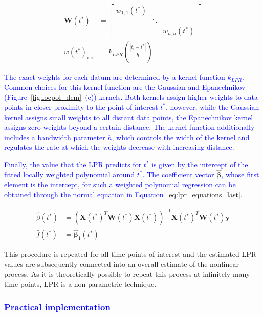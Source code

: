 \documentclass[man, floatsintext]{apa7}
\begin{document}
\begin{align}
  \textbf{W}(t^*) & =
  \begin{bmatrix}
    w_{1, 1}(t^*) &        &               \\
                  & \ddots &               \\
                  &        & w_{n, n}(t^*)
  \end{bmatrix}               \\
  w(t^*)_{i, i}   & = k_{LPR}(\frac{|t_i - t^*|}{h})
  \label{eq:lpr_equations_weights}
\end{align}

\noindent\textcolor{blue}{ The exact weights for each datum are determined by a
  kernel function $k_{LPR}$. Common choices for this kernel function are the
  Gaussian and Epanechnikov (Figure~\ref{fig:locpol_dem}~(c)) kernels. Both
  kernels assign higher weights to data points in closer proximity to the point
  of interest $t^*$, however, while the Gaussian kernel assigns small weights
  to all distant data points, the Epanechnikov kernel assigns zero weights
  beyond a certain distance. The kernel function additionally includes a
  bandwidth parameter $h$, which controls the width of the kernel and regulates
  the rate at which the weights decrease with increasing distance. }

\textcolor{blue}{
  Finally, the value that the LPR predicts for $t^*$ is given
  by the intercept of the fitted locally weighted polynomial around $t^*$.
  The coefficient vector }$\hat{\boldsymbol{\beta}}$\textcolor{blue}{, whose
  first element is the
  intercept, for such a weighted polynomial regression can be obtained through
  the normal equation in Equation~\ref{eq:lpr_equations_last}.
}

\begin{align}
  \hat{\beta}(t^*) & =
  (\textbf{X}(t^*)^T\textbf{W}(t^*)\textbf{X}(t^*))^{-1}
  \textbf{X}(t^*)^T\textbf{W}(t^*)\textbf{y}
  \label{eq:lpr_equations_last}                \\
  \hat{f}(t^*)     & = \hat{\bm{\beta}}_1(t^*)
\end{align}

This procedure is repeated for all
time points of interest and the estimated LPR values are subsequently connected
into an overall estimate of the nonlinear process.
As it is theoretically possible to repeat this process at infinitely many
time points, LPR is a non-parametric technique.

\subsubsection{\textcolor{blue}{Practical implementation}}
\end{document}

